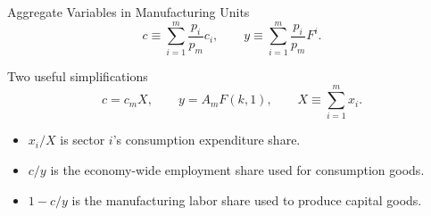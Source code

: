 \begin{frame}{Aggregate Variables in Manufacturing Units}
  \small
  \begin{equation*}
    c\equiv\sum_{i=1}^m \frac{p_i}{p_m}c_i,\qquad
    y\equiv\sum_{i=1}^m \frac{p_i}{p_m}F^i .
  \end{equation*}

  \vspace{0.12cm}
  \begin{block}{Two useful simplifications}
    \begin{equation*}
      c=c_m X,\qquad y=A_m F(k,1),\qquad
      X\equiv\sum_{i=1}^m x_i .
    \end{equation*}
  \end{block}

  \vspace{0.12cm}
  \begin{itemize}
    \item $x_i/X$ is sector $i$'s consumption expenditure share.
    \item $c/y$ is the economy-wide employment share used for consumption goods.
    \item $1-c/y$ is the manufacturing labor share used to produce capital goods.
  \end{itemize}
\end{frame}
